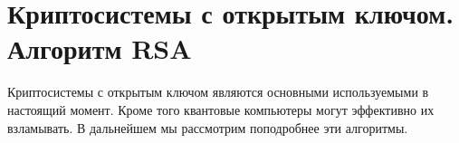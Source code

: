 \chapter{Криптосистемы с открытым ключом. Алгоритм RSA}
Криптосистемы с открытым ключом являются основными используемыми в
настоящий момент. Кроме того квантовые компьютеры могут эффективно их
взламывать. В дальнейшем мы рассмотрим поподробнее эти алгоритмы.









